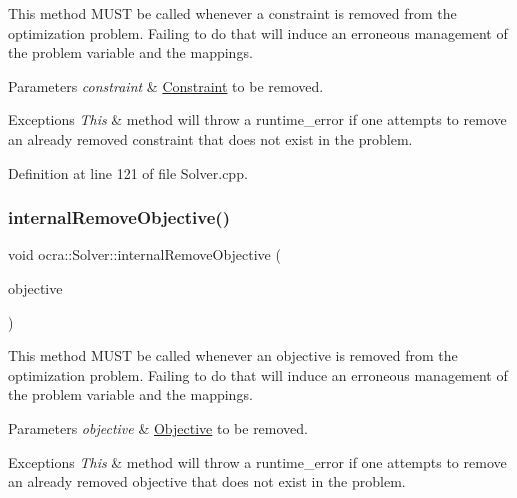 This method M\+U\+ST be called whenever a constraint is removed from the optimization problem. Failing to do that will induce an erroneous management of the problem variable and the mappings.


\begin{DoxyParams}{Parameters}
{\em constraint} & \hyperlink{classocra_1_1Constraint}{Constraint} to be removed. \\
\hline
\end{DoxyParams}

\begin{DoxyExceptions}{Exceptions}
{\em This} & method will throw a runtime\+\_\+error if one attempts to remove an already removed constraint that does not exist in the problem. \\
\hline
\end{DoxyExceptions}


Definition at line 121 of file Solver.\+cpp.

\hypertarget{classocra_1_1Solver_a1acd7d8b110f30f06cb157f15faa8e31}{}\label{classocra_1_1Solver_a1acd7d8b110f30f06cb157f15faa8e31} 
\subsubsection{\texorpdfstring{internal\+Remove\+Objective()}{internalRemoveObjective()}}
{\footnotesize\ttfamily void ocra\+::\+Solver\+::internal\+Remove\+Objective (\begin{DoxyParamCaption}\item[{const \hyperlink{namespaceocra_a37a91885f4fa5c523d22cb15d5673062}{Generic\+Objective} \&}]{objective }\end{DoxyParamCaption})\hspace{0.3cm}{\ttfamily [protected]}}

This method M\+U\+ST be called whenever an objective is removed from the optimization problem. Failing to do that will induce an erroneous management of the problem variable and the mappings.


\begin{DoxyParams}{Parameters}
{\em objective} & \hyperlink{classocra_1_1Objective}{Objective} to be removed. \\
\hline
\end{DoxyParams}

\begin{DoxyExceptions}{Exceptions}
{\em This} & method will throw a runtime\+\_\+error if one attempts to remove an already removed objective that does not exist in the problem. \\
\hline
\end{DoxyExceptions}


